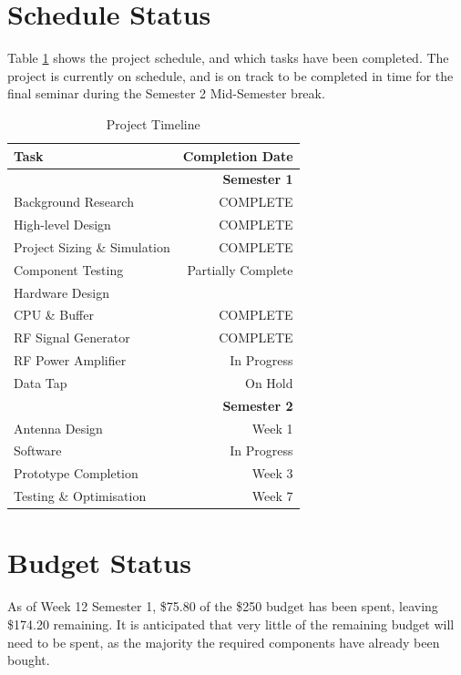 \documentclass[a4paper,12pt]{article}
\begin{document}
\section{Schedule Status}
Table \ref{timeline} shows the project schedule, and which tasks have been completed. The project is currently on schedule, and is on track to be completed in time for the final seminar during the Semester 2 Mid-Semester break.
\begin{table}[h!]
\begin{center}
\caption{Project Timeline}
\label{timeline}
\begin{tabular}{l|r}
\textbf{Task} & \textbf{Completion Date}\\
\hline
& \textbf{Semester 1}\\
Background Research & COMPLETE\\
High-level Design & COMPLETE\\
Project Sizing \& Simulation & COMPLETE\\
Component Testing & Partially Complete\\
Hardware Design& \\
\hspace{15pt}CPU \& Buffer & COMPLETE\\
\hspace{15pt}RF Signal Generator & COMPLETE\\
\hspace{15pt}RF Power Amplifier & In Progress\\
\hspace{15pt}Data Tap & On Hold\\
& \textbf{Semester 2}\\
\hspace{15pt}Antenna Design & Week 1\\
Software & In Progress\\
Prototype Completion & Week 3\\
Testing \& Optimisation & Week 7\\
\end{tabular}
\end{center}
\end{table}

\section{Budget Status}
As of Week 12 Semester 1, \$75.80 of the \$250 budget has been spent, leaving \$174.20 remaining. It is anticipated that very little of the remaining budget will need to be spent, as the majority the required components have already been bought.
\end{document}
